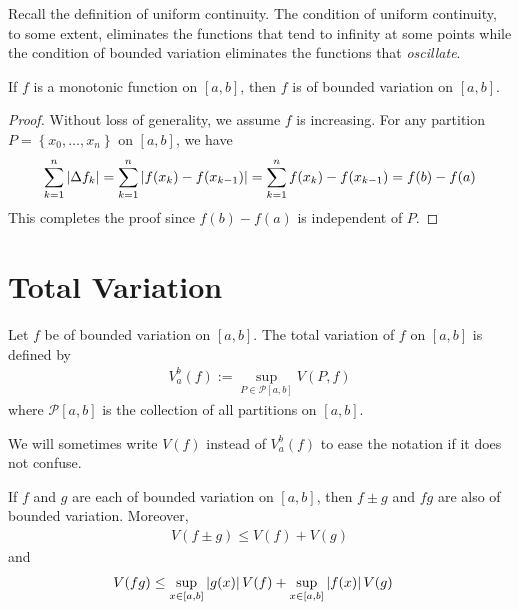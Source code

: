 \documentclass[thmcnt=section, 12pt]{my-elegantbook}
\begin{document}
\par Recall the definition of uniform continuity. The condition of uniform continuity, to some extent, eliminates the functions that tend to infinity at some points while the condition of bounded variation eliminates the functions that \textit{oscillate}.


\begin{theorem} \label{thm:36}
    If $f$ is a monotonic function on $[a, b]$, then $f$ is of bounded variation on $[a, b]$.
\end{theorem}

\begin{proof}
    Without loss of generality, we assume $f$ is increasing. For any partition $P = \left\{x_0, \ldots, x_n\right\}$ on $[a, b]$, we have
    \begin{align*}
        \sum_{k=1}^n \left\lvert \Delta f_k \right\rvert
        = \sum_{k=1}^n \left\lvert f(x_k) - f(x_{k-1}) \right\rvert
        = \sum_{k=1}^n f(x_k) - f(x_{k-1})
        = f(b) - f(a)
    \end{align*}
    This completes the proof since $f(b) - f(a)$ is independent of $P$.
\end{proof}


\section{Total Variation}


\begin{definition}
    Let $f$ be of bounded variation on $[a, b]$. The total variation of $f$ on $[a, b]$ is defined by
    \begin{align*}
        V_a^b (f)
        := \sup_{P \in \mathcal{P}[a, b]} V(P, f)
    \end{align*}
    where $\mathcal{P}[a, b]$ is the collection of all partitions on $[a, b]$.
\end{definition}

\begin{note}
    We will sometimes write $V(f)$ instead of $V_a^b (f)$ to ease the notation if it does not confuse.
\end{note}


\begin{theorem} \label{thm:33}
    If $f$ and $g$ are each of bounded variation on $[a, b]$, then $f \pm g$ and $f g$ are also of bounded variation. Moreover,
    \begin{align}
        V(f \pm g) \leq V(f) + V(g)
        \label{eq:77}
    \end{align}
    and
    \begin{align}
        V(f g) & \leq \sup_{x\in [a, b]} \left\lvert g(x) \right\rvert V(f) + \sup_{x \in [a, b]} \left\lvert f(x) \right\rvert V(g)
        \label{eq:78}
    \end{align}
\end{theorem}
\end{document}

